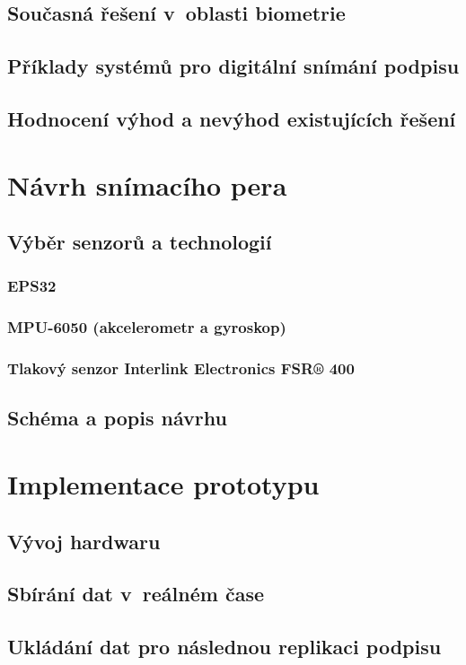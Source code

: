 \section{Současná řešení v~oblasti biometrie}
\section{Příklady systémů pro digitální snímání podpisu}
\section{Hodnocení výhod a nevýhod existujících řešení}

\chapter{Návrh snímacího pera}
\section{Výběr senzorů a technologií}
\subsection{EPS32}
\subsection{MPU-6050 (akcelerometr a gyroskop)}
\subsection{Tlakový senzor Interlink Electronics FSR® 400}
\section{Schéma a popis návrhu}

\chapter{Implementace prototypu}
\section{Vývoj hardwaru}
\section{Sbírání dat v~reálném čase}
\section{Ukládání dat pro následnou replikaci podpisu}

